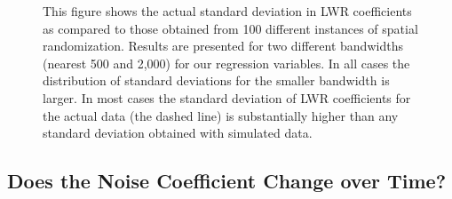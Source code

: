 \documentclass{article}\usepackage{graphicx, color}
\begin{document}
\begin{figure}
 \caption{This figure shows the actual standard deviation in LWR coefficients as compared to those obtained from 100 different instances of spatial randomization. Results are presented for two different bandwidths (nearest 500 and 2,000) for our regression variables. In all cases the distribution of standard deviations for the smaller bandwidth is larger. In most cases the standard deviation of LWR coefficients for the actual data (the dashed line) is substantially higher than any standard deviation obtained with simulated data.}
 \label{fig:MCsim2}
\end{figure}

\subsection{Does the Noise Coefficient Change over Time?}
\end{document}
